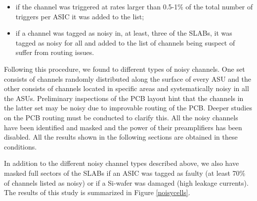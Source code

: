 \documentclass[a4paper,11pt]{article}
\begin{document}
\begin{itemize}
\item if the channel was triggered at rates larger than 0.5-1\% of the total number of triggers per ASIC it was added to the list;
\item if a channel was tagged as noisy in, at least, three of the SLABs, it was tagged as noisy for all and added to the list of channels being suspect of suffer from routing issues.
\end{itemize}

Following this procedure, we found to different types of noisy channels. One set consists of
channels randomly distributed along the surface of every ASU and the other consists
of channels located in specific areas and systematically noisy in all the ASUs. Preliminary inspections of the PCB layout
hint that the channels in the latter set may be noisy due to
improvable routing of the PCB.
Deeper studies on the PCB routing must be conducted to clarify this.
All the noisy channels have been identified and masked and the power
of their preamplifiers has been disabled. All the results shown in the following
sections are obtained in these conditions.

In addition to the different noisy channel types described above, we also have
masked full sectors of the SLABs if an ASIC was tagged as faulty (at least 70\% of channels 
listed as noisy) or if a Si-wafer was damaged (high leakage currents).
The results of this study is summarized in Figure \ref{noisycells}.
\end{document}
